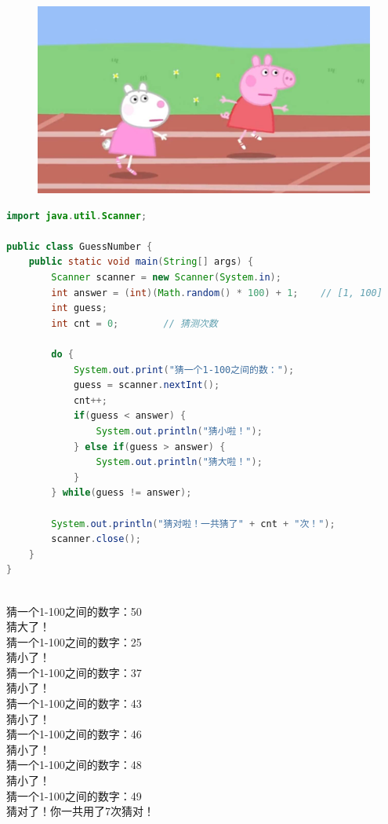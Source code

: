 \begin{figure}[H]
	\centering
	\includegraphics[scale=0.2]{img/C4/4-3/1.png}
\end{figure}


\begin{lstlisting}[language=Java]
import java.util.Scanner;

public class GuessNumber {
    public static void main(String[] args) {
        Scanner scanner = new Scanner(System.in);
        int answer = (int)(Math.random() * 100) + 1;    // [1, 100]
        int guess;
        int cnt = 0;        // 猜测次数
        
        do {
            System.out.print("猜一个1-100之间的数：");
            guess = scanner.nextInt();
            cnt++;
            if(guess < answer) {
                System.out.println("猜小啦！");
            } else if(guess > answer) {
                System.out.println("猜大啦！");
            }
        } while(guess != answer);
        
        System.out.println("猜对啦！一共猜了" + cnt + "次！");
        scanner.close();
    }
}
\end{lstlisting}

\begin{tcolorbox}
	 \\
	猜一个1-100之间的数字：50 \\
	猜大了！ \\
	猜一个1-100之间的数字：25 \\
	猜小了！ \\
	猜一个1-100之间的数字：37 \\
	猜小了！ \\
	猜一个1-100之间的数字：43 \\
	猜小了！ \\
	猜一个1-100之间的数字：46 \\
	猜小了！ \\
	猜一个1-100之间的数字：48 \\
	猜小了！ \\
	猜一个1-100之间的数字：49 \\
	猜对了！你一共用了7次猜对！
\end{tcolorbox}

